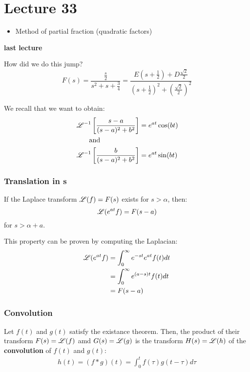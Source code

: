 
\chapter*{Lecture 33}

\begin{recall}{}{}
\begin{itemize}
\item Method of partial fraction 
(quadratic factors)
\end{itemize}
\end{recall}





\textbf{last lecture}

How did we do this jump?
\begin{equation*}
F(s)=\frac{\frac{s}{2}}{s^2+s+\frac{3}{4}}=\frac{E(s+\frac{1}{2}) + D\frac{\sqrt{2}}{2}}{(s+\frac{1}{2})^2+(\frac{\sqrt{2}}{2})^2}
\end{equation*}

We recall that we want to obtain:
\begin{align*}
&\operatorname{\mathscr{L}}^{-1}\left[\frac{s-a}{(s-a)^2+b^2}\right]=e^{at}\cos(bt)\\
&\qquad \text{and}\\
&\operatorname{\mathscr{L}}^{-1}\left[\frac{b}{(s-a)^2+b^2}\right]=e^{at}\sin(bt)
\end{align*}




\subsection{Translation in s}
If the Laplace transform $\operatorname{\mathscr{L}} (f)=F(s)$ exists for $s>\alpha$, then:
\begin{equation}
\operatorname{\mathscr{L}} (e^{at}f)= F(s-a)
\end{equation}
for $s>\alpha+a$.

This property can be proven by computing the Laplacian:
\begin{align*}
\operatorname{\mathscr{L}} (e^{at}f)&= \int^\infty_0 e^{-st}e^{at}f(t) dt\\
&= \int^\infty_0 e^{(a-s)t}f(t) dt\\
&=F(s-a)
\end{align*}



\subsection{Convolution}
Let $f(t)$ and $g(t)$ satisfy the existance theorem. Then, the product of their transform $F(s)=\operatorname{\mathscr{L}}(f)$ amd $G(s)=\operatorname{\mathscr{L}}(g)$ is the transform $H(s)=\operatorname{\mathscr{L}}(h)$ of the \textbf{convolution} of $f(t)$ and $g(t)$:
\begin{align*}
h(t) = (f*g)(t) = \int^t_0 f(\tau)g(t-\tau) d\tau
\end{align*}


